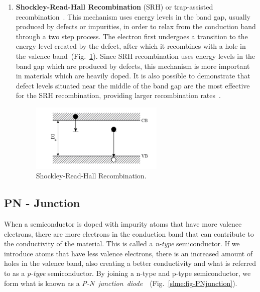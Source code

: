 \begin{refsection}
\begin{enumerate}[]
\vspace{0.2in} 
	\item\textbf{Shockley-Read-Hall Recombination} (SRH) or trap-assisted 
recombination~\cite{Shockley1952}\cite{Hall1952}. This mechanism uses energy 
levels in the band gap, usually produced by defects or impurities, in order to 
relax from the conduction band through a two step process. The electron first 
undergoes a transition to the energy level created by the defect, after which 
it recombines with a hole in the valence band~(Fig.~\ref{slme:fig-SRHrec}). 
Since SRH recombination uses energy levels in the band gap which are produced 
by defects, this mechanism is more important in materials which are heavily 
doped. It is also possible to demonstrate that defect levels situated near the 
middle of the band gap are the most effective for the SRH recombination, 
providing larger recombination rates~\cite{Green1981}. 
 
\begin{figure}[!htp]  
\centering 
\includegraphics[width=0.6\textwidth]{./Figures/slme/SRHrec.png} 
\caption{\label{slme:fig-SRHrec}Shockley-Read-Hall Recombination.} 
\end{figure} 
 
\end{enumerate} 
 
\pagebreak[4] 
\subsection{PN - Junction} 
 
When a semiconductor is doped with impurity atoms that have more valence 
electrons, there are more electrons in the conduction band that can contribute 
to the conductivity of the material. This is called a \textit{n-type} 
semiconductor. If we introduce atoms that have less valence electrons, there 
is an increased amount of holes in the valence band, also creating a better 
conductivity and what is referred to as a \textit{p-type} semiconductor. By 
joining a n-type and p-type semiconductor, we form what is known as a 
\textit{P-N~junction~diode}~\cite{Shockley1949}~(Fig.~\ref{slme:fig-PNjunction}). 
 

\end{refsection}
